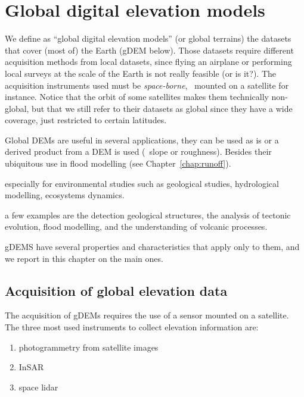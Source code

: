 
\setchapterpreamble[u]{\margintoc}
\graphicspath{{gdem/figs/}}


\chapter{Global digital elevation models}%
\label{chap:gdem}

We define as ``global digital elevation models'' (or global terrains) the datasets that cover (most of) the Earth (gDEM below).%
Those datasets require different acquisition methods from local datasets, since flying an airplane or performing local surveys at the scale of the Earth is not really feasible (or is it?).
The acquisition instruments used must be \emph{space-borne}, \ie\ mounted on a satellite for instance.
Notice that the orbit of some satellites makes them technically non-global, but that we still refer to their datasets as global since they have a wide coverage, just restricted to certain latitudes.

Global DEMs are useful in several applications, they can be used as is or a derived product from a DEM is used (\eg\ slope or roughness).
Besides their ubiquitous use in flood modelling (see Chapter~\ref{chap:runoff}).

especially for environmental studies such as geological studies, hydrological modelling, ecosystems dynamics.

a few examples are the detection geological structures, the analysis of tectonic evolution, flood modelling, and the understanding of volcanic processes.


gDEMS have several properties and characteristics that apply only to them, and we report in this chapter on the main ones.



%
\section[Acquisition of global data]{Acquisition of global elevation data}

The acquisition of gDEMs requires the use of a sensor mounted on a satellite.
The three most used instruments to collect elevation information are:
\begin{enumerate}
  \item photogrammetry from satellite images
  \item InSAR
  \item space lidar
\end{enumerate}


